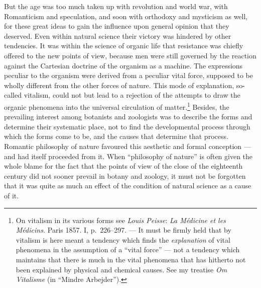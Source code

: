 \documentclass[12pt,a4paper]{book}
\newcommand{\opage}[1]{\marginnote{\footnotesize\textit{[#1]}}}
\begin{document}
But the age was too much taken up with revolution and world war, with
Romanticism and speculation, and soon with orthodoxy and mysticism as well, for
these great ideas to gain the influence upon general opinion that they deserved.
Even within natural science their victory was hindered by other tendencies. It
was within the science of organic life that resistance was chiefly offered to
the new points of view, because men were still governed by the reaction against
the Cartesian doctrine of the \opage{496}organism as a machine. The expressions peculiar to
the organism were derived from a peculiar vital force, supposed to be wholly
different from the other forces of nature. This mode of explanation, so-called
vitalism, could not but lead to a rejection of the attempts to draw the organic
phenomena into the universal circulation of
matter.\footnote{On vitalism in its various forms see \emph{Louis Peisse}: \textit{La
Médicine et les Médicins.} Paris 1857. I, p.~226--297. --- It must be firmly
held that by vitalism is here meant a tendency which finds the
\emph{explanation} of vital phenomena in the assumption of a ``vital force'' ---
not \opage{597}a tendency which maintains that there is much in the vital phenomena that
has hitherto not been explained by physical and chemical causes. See my treatise
\textit{Om Vitalisme} (in ``Mindre Arbejder'').} Besides, the prevailing
interest among botanists and zoologists was to describe the forms and determine
their systematic place, not to find the developmental process through which the
forms come to be, and the causes that determine that process. Romantic
philosophy of nature favoured this aesthetic and formal conception --- and had
itself proceeded from it. When ``philosophy of nature'' is often given the whole
blame for the fact that the points of view of the close of the eighteenth
century did not sooner prevail in botany and zoology, it must not be forgotten
that it was quite as much an effect of the condition of natural science as a
cause of it.
\end{document}

